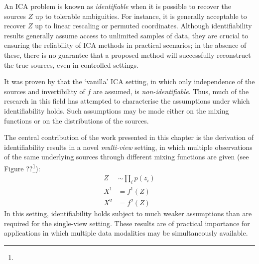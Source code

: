 
An ICA problem is known as \emph{identifiable} when it is possible to recover the sources $Z$ up to tolerable ambiguities. 
For instance, it is generally acceptable to recover $Z$ up to linear rescaling or permuted coordinates.
Although identifiability results generally assume access to unlimited samples of data, they are crucial to ensuring the reliability of ICA methods in practical scenarios; in the absence of these, there is no guarantee that a proposed method will successfully reconstruct the true sources, even in controlled settings.

It was proven by \cite{hyvarinen1999nonlinear} that the `vanilla' ICA setting, in which only independence of the sources and invertibility of $f$ are assumed, is \emph{non-identifiable}.
Thus, much of the research in this field has attempted to characterise the assumptions under which identifiability holds.
Such assumptions may be made either on the mixing functions or on the distributions of the sources. 

The central contribution of the work presented in this chapter is the derivation of identifiability results in a novel \emph{multi-view} setting, in which multiple observations of the same underlying sources through different mixing functions are given (see Figure ??\footnote{}):
%
\begin{align*}
Z &\sim \prod_i p(z_i) \\
X^1 &= f^1(Z) \\
X^2 &= f^2(Z)
\end{align*}
%
In this setting, identifiability holds subject to much weaker assumptions than are required for the single-view setting.
These results are of practical importance for applications in which multiple data modalities may be simultaneously available.


